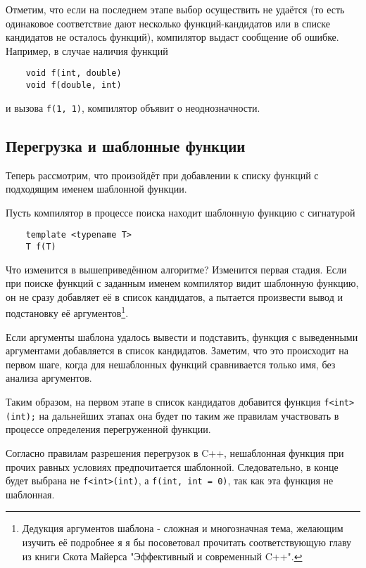 	Отметим, что если на последнем этапе выбор осуществить не удаётся (то есть одинаковое соответствие дают несколько функций-кандидатов или в списке кандидатов не осталось функций), компилятор выдаст сообщение об ошибке. Например, в случае наличия функций
	
	\begin{verbatim}
	void f(int, double)
	void f(double, int)
	\end{verbatim}
	
	и вызова \texttt{f(1, 1)}, компилятор объявит о неоднозначности.

\subsection{Перегрузка и шаблонные функции}
	Теперь рассмотрим, что произойдёт при добавлении к списку функций с подходящим именем шаблонной функции.

	Пусть компилятор в процессе поиска находит шаблонную функцию с сигнатурой
	
	\begin{verbatim}
	template <typename T>
	T f(T)
	\end{verbatim}
	
	Что изменится в вышеприведённом алгоритме? Изменится первая стадия. Если при поиске функций с заданным именем компилятор видит шаблонную функцию, он не сразу добавляет её в список кандидатов, а пытается произвести вывод и подстановку её аргументов\footnote{%
	Дедукция аргументов шаблона - сложная и многозначная тема, желающим изучить её подробнее я я бы посоветовал прочитать соответствующую главу из книги Скота Майерса "Эффективный и современный C++".}.
	
	Если аргументы шаблона удалось вывести и подставить, функция с выведенными аргументами добавляется в список кандидатов. Заметим, что это происходит на первом шаге, когда для нешаблонных функций сравнивается только имя, без анализа аргументов.
	
	Таким образом, на первом этапе в список кандидатов добавится функция \texttt{f<int> (int);} на дальнейших этапах она будет по таким же правилам участвовать в процессе определения перегруженной функции. 
	
	Согласно правилам разрешения перегрузок в C++, нешаблонная функция при прочих равных условиях предпочитается шаблонной. Следовательно, в конце будет выбрана не \texttt{f<int>(int)}, а \texttt{f(int, int = 0)}, так как эта функция не шаблонная.
	
